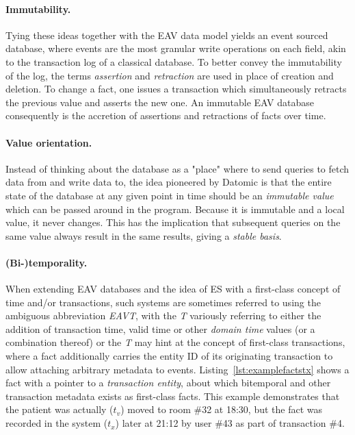 \paragraph{Immutability.} Tying these ideas together with the EAV data model yields an event sourced database, where events are the most granular write operations on each field, akin to the transaction log of a classical database. To better convey the immutability of the log, the terms \emph{assertion} and \emph{retraction} are used in place of creation and deletion. To change a fact, one issues a transaction which simultaneously retracts the previous value and asserts the new one. An immutable EAV database consequently is the accretion of assertions and retractions of facts over time.

\paragraph{Value orientation.} Instead of thinking about the database as a "place" where to send queries to fetch data from and write data to, the idea pioneered by Datomic is that the entire state of the database at any given point in time should be an \emph{immutable value} which can be passed around in the program. Because it is immutable and a local value, it never changes. This has the implication that subsequent queries on the same value always result in the same results, giving a \emph{stable basis}.

\cleardoublepage
\paragraph{(Bi-)temporality.}

When extending EAV databases and the idea of \gls{ES} with a first-class concept of time and/or transactions, such systems are sometimes referred to using the ambiguous abbreviation \emph{EAVT}, with the \emph{T} variously referring to either the addition of transaction time, valid time or other \emph{domain time} values (or a combination thereof) \cite{huser2013desiderata} or the \emph{T} may hint at the concept of first-class transactions, where a fact additionally carries the entity ID of its originating transaction to allow attaching arbitrary metadata to events. Listing~\ref{lst:examplefactstx} shows a fact with a pointer to a \emph{transaction entity}, about which bitemporal and other transaction metadata exists as first-class facts. This example demonstrates that the patient was actually ($t_v$) moved to room \#32 at 18:30, but the fact was recorded in the system ($t_x$) later at 21:12 by user \#43 as part of transaction \#4.

